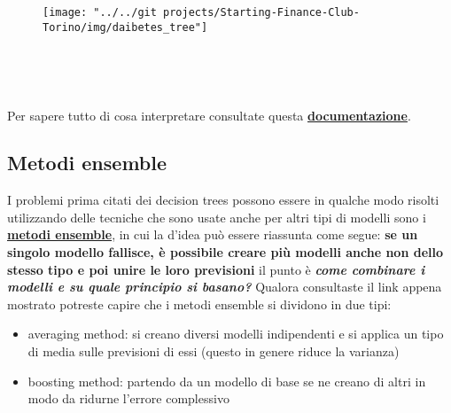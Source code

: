\documentclass[11pt]{article}
\providecommand{\tightlist}{%
      \setlength{\itemsep}{0pt}\setlength{\parskip}{0pt}}
\begin{document}
    \begin{figure}
    	\centering
    	\texttt{[image: "../../git projects/Starting-Finance-Club-Torino/img/daibetes\_tree"]}
    	\caption{}
    	\label{fig:daibetestree}
    \end{figure}
    
    
    \begin{center}
    \end{center}
    { \hspace*{\fill} \\}
    
    \begin{center}
    \end{center}
    { \hspace*{\fill} \\}
    
    Per sapere tutto di cosa interpretare consultate questa
\textbf{\href{https://scikit-learn.org/stable/auto_examples/tree/plot_unveil_tree_structure.html\#sphx-glr-auto-examples-tree-plot-unveil-tree-structure-py}{documentazione}}.

\hypertarget{metodi-ensemble}{%
\subsection{Metodi ensemble}\label{metodi-ensemble}}

I problemi prima citati dei decision trees possono essere in qualche
modo risolti utilizzando delle tecniche che sono usate anche per altri
tipi di modelli sono i
\textbf{\href{https://scikit-learn.org/stable/modules/ensemble.html}{metodi
ensemble}}, in cui la d'idea può essere riassunta come segue: \textbf{se
un singolo modello fallisce, è possibile creare più modelli anche non
dello stesso tipo e poi unire le loro previsioni} il punto è
\textbf{\emph{come combinare i modelli e su quale principio si basano?}}
Qualora consultaste il link appena mostrato potreste capire che i metodi
ensemble si dividono in due tipi:

\begin{itemize}
\tightlist
\item
  averaging method: si creano diversi modelli indipendenti e si applica
  un tipo di media sulle previsioni di essi (questo in genere riduce la
  varianza)
\item
  boosting method: partendo da un modello di base se ne creano di altri
  in modo da ridurne l'errore complessivo
\end{itemize}
\end{document}
